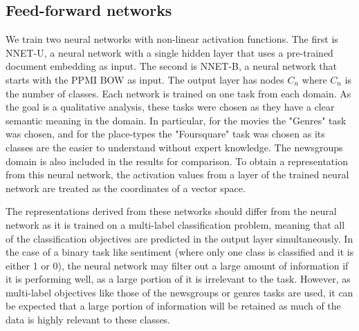 




\subsection{Feed-forward networks}

We train two neural networks with non-linear activation functions. The first is NNET-U, a neural network with a single hidden layer that uses a pre-trained document embedding as input. The second is NNET-B, a neural network that starts with the PPMI BOW as input. The output layer has nodes $C_n$ where $C_n$ is the number of classes. Each network is trained on one task from each domain. As the goal is a qualitative analysis, these tasks were chosen as they have a clear semantic meaning in the domain. In particular, for the movies the "Genres" task was chosen, and for the place-types the "Foursquare" task was chosen as its classes are the easier to understand without expert knowledge. The newsgroups domain is also included in the results for comparison. To obtain a representation from this neural network, the activation values from a layer of the trained neural network are treated as the coordinates of a vector space.

The representations derived from these networks should differ from the  neural network as it is trained on a multi-label classification problem, meaning that all of the classification objectives are predicted in the output layer simultaneously. In the case of a binary task like sentiment (where only one class is classified and it is either 1 or 0),  the neural network may filter out a large amount of information if it is performing well, as a large portion of it is irrelevant to the task. However, as multi-label objectives like those of the newsgroups or genres tasks are used, it can be expected that a large portion of information will be retained as much of the data is highly relevant to these classes. 


